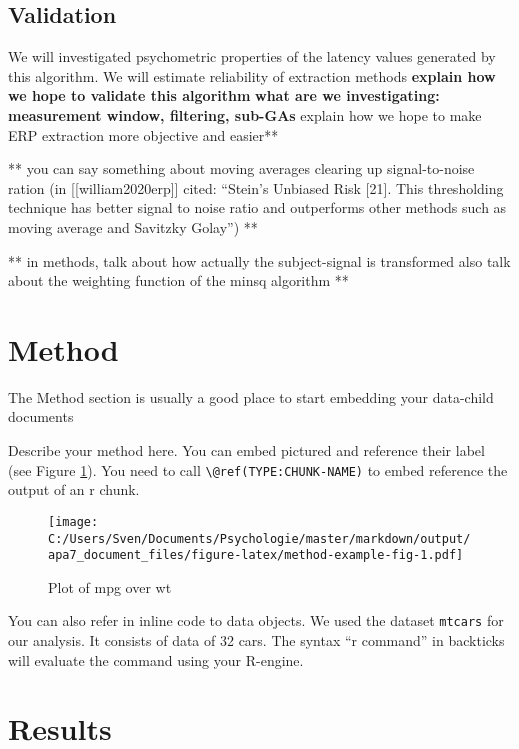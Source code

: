 \documentclass[
  man,floatsintext]{apa7}
\begin{document}
\hypertarget{validation}{%
\subsection{Validation}\label{validation}}

We will investigated psychometric properties of the latency values generated by this algorithm. We will estimate reliability of extraction methods
\textbf{explain how we hope to validate this algorithm}
\textbf{what are we investigating: measurement window, filtering, sub-GAs
}explain how we hope to make ERP extraction more objective and easier**

** you can say something about moving averages clearing up signal-to-noise ration (in {[}{[}william2020erp{]}{]} cited: ``Stein's Unbiased Risk {[}21{]}. This thresholding technique has better signal to noise ratio and outperforms other methods such as moving average and Savitzky Golay'') **

** in methods, talk about how actually the subject-signal is transformed \textbf{
} also talk about the weighting function of the minsq algorithm **

\hypertarget{method}{%
\section{Method}\label{method}}

The Method section is usually a good place to start embedding your data-child documents

Describe your method here. You can embed pictured and reference their label (see Figure \ref{fig:method-example-fig}). You need to call \texttt{\textbackslash{}@ref(TYPE:CHUNK-NAME)} to embed reference the output of an r chunk.

\begin{figure}
\centering
\texttt{[image: C:/Users/Sven/Documents/Psychologie/master/markdown/output/apa7\_document\_files/figure-latex/method-example-fig-1.pdf]}
\caption{\label{fig:method-example-fig}Plot of mpg over wt}
\end{figure}

You can also refer in inline code to data objects. We used the dataset \texttt{mtcars} for our analysis. It consists of data of 32 cars. The syntax ``r command'' in backticks will evaluate the command using your R-engine.

\hypertarget{results}{%
\section{Results}\label{results}}
\end{document}
